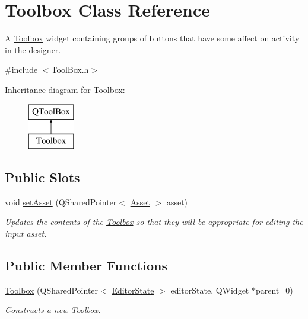 \hypertarget{class_toolbox}{\section{Toolbox Class Reference}
\label{class_toolbox}
}


A \hyperlink{class_toolbox}{Toolbox} widget containing groups of buttons that have some affect on activity in the designer.  




{\ttfamily \#include $<$Tool\-Box.\-h$>$}

Inheritance diagram for Toolbox\-:\begin{figure}[H]
\begin{center}
\leavevmode
\includegraphics[height=2.000000cm]{class_toolbox}
\end{center}
\end{figure}
\subsection*{Public Slots}
\begin{DoxyCompactItemize}
\item 
void \hyperlink{class_toolbox_a444228bc72b75db264783bb43062d328}{set\-Asset} (Q\-Shared\-Pointer$<$ \hyperlink{class_picto_1_1_asset}{Asset} $>$ asset)
\begin{DoxyCompactList}\small\item\em Updates the contents of the \hyperlink{class_toolbox}{Toolbox} so that they will be appropriate for editing the input asset. \end{DoxyCompactList}\end{DoxyCompactItemize}
\subsection*{Public Member Functions}
\begin{DoxyCompactItemize}
\item 
\hyperlink{class_toolbox_a7402c6a6bbae6967d79b3a3502f00942}{Toolbox} (Q\-Shared\-Pointer$<$ \hyperlink{class_editor_state}{Editor\-State} $>$ editor\-State, Q\-Widget $\ast$parent=0)
\begin{DoxyCompactList}\small\item\em Constructs a new \hyperlink{class_toolbox}{Toolbox}. \end{DoxyCompactList}\end{DoxyCompactItemize}


